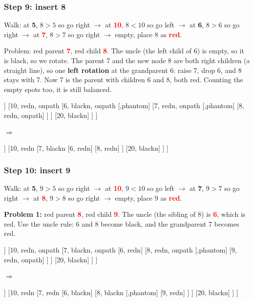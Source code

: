 \documentclass[11pt]{article}
\newcommand{\rd}[1]{\textcolor{Red}{\textbf{#1}}}   %
\newcommand{\bk}[1]{\textbf{#1}}                    %
\begin{document}
	\subsubsection*{Step 9: insert 8}
	Walk: at \bk{5}, $8>5$ so go right $\to$ at \rd{10}, $8<10$ so go left $\to$ at \bk{6}, $8>6$ so go right $\to$ at \rd{7}, $8>7$ so go right $\to$ empty, place 8 as \rd{red}.
	
	Problem: red parent \rd{7}, red child \rd{8}. The uncle (the left child of 6) is empty, so it is black, so we rotate. The parent 7 and the new node 8 are both right children (a straight line), so one \textbf{left rotation} at the grandparent 6: raise 7, drop 6, and 8 stays with 7. Now 7 is the parent with children 6 and 8, both red. Counting the empty spots too, it is still balanced.
	\begin{center}
		\begin{forest}
			[5, blackn
			[3, blackn
			[1, redn]
			[4, redn]
			]
			[10, redn, onpath
			[6, blackn, onpath
			[,phantom]
			[7, redn, onpath
			[,phantom]
			[8, redn, onpath]
			]
			]
			[20, blackn]
			]
			]
		\end{forest}
		\quad$\Rightarrow$\quad
		\begin{forest}
			[5, blackn
			[3, blackn
			[1, redn]
			[4, redn]
			]
			[10, redn
			[7, blackn
			[6, redn]
			[8, redn]
			]
			[20, blackn]
			]
			]
		\end{forest}
	\end{center}
	
	\subsubsection*{Step 10: insert 9}
	Walk: at \bk{5}, $9>5$ so go right $\to$ at \rd{10}, $9<10$ so go left $\to$ at \bk{7}, $9>7$ so go right $\to$ at \rd{8}, $9>8$ so go right $\to$ empty, place 9 as \rd{red}.
	
	\textbf{Problem 1:} red parent \rd{8}, red child \rd{9}. The uncle (the sibling of 8) is \rd{6}, which is red. Use the uncle rule: 6 and 8 become black, and the grandparent 7 becomes red.
	\begin{center}
		\begin{forest}
			[5, blackn
			[3, blackn
			[1, redn]
			[4, redn]
			]
			[10, redn, onpath
			[7, blackn, onpath
			[6, redn]
			[8, redn, onpath
			[,phantom]
			[9, redn, onpath]
			]
			]
			[20, blackn]
			]
			]
		\end{forest}
		\quad$\Rightarrow$\quad
		\begin{forest}
			[5, blackn
			[3, blackn
			[1, redn]
			[4, redn]
			]
			[10, redn
			[7, redn
			[6, blackn]
			[8, blackn
			[,phantom]
			[9, redn]
			]
			]
			[20, blackn]
			]
			]
		\end{forest}
	\end{center}
	
\end{document}
